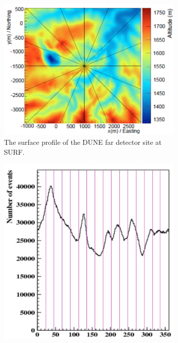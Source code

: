 \begin{figure}[h!]
  \centering
  \begin{subfigure}{0.45\textwidth}
    \centering
    \includegraphics[width=\textwidth]{dune-surface-map}
    \caption{The surface profile of the DUNE far detector site at SURF.}
    \label{fig:SurfProf_Col}
  \end{subfigure}
  \hspace{0.08\textwidth}
  \begin{subfigure}{0.45\textwidth}
    \centering
    \includegraphics[width=\textwidth]{phi-map}

\end{subfigure}
\end{figure}
